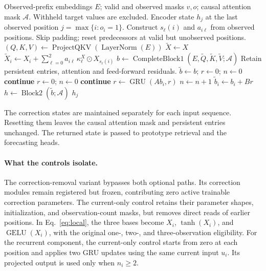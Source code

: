 \documentclass[runningheads]{llncs}
\newcommand{\GELU}{\operatorname{GELU}}
\begin{document}
\begin{algorithm}[H]
\caption{Causal local and recurrent history correction}
\label{alg:history-correction}
\small
\begin{algorithmic}[1]
\Require Observed-prefix embeddings $E$; valid and observed masks $v,o$;
\Statex \hspace{\algorithmicindent} causal attention mask $\mathcal A$. Withheld target values are excluded.
\Ensure Encoder state $h_j$ at the last observed position $j=\max\{i:o_i=1\}$.
\State Construct $s_\ell(i)$ and $a_{i\ell}$ from observed positions.
\Statex \hspace{\algorithmicindent} Skip padding; reset predecessors at valid but unobserved positions.
\State $(Q,K,V)\gets\operatorname{ProjectQKV}(\operatorname{LayerNorm}(E))$
    \State $\widetilde X\gets X$
        \State $\widetilde X_i\gets X_i+\sum_{\ell=0}^{2}a_{i\ell}\,\kappa^X_\ell\odot X_{s_\ell(i)}$
    \EndFor
\EndFor
\State $b\gets\operatorname{CompleteBlock1}(E,\widetilde Q,\widetilde K,\widetilde V;\mathcal A)$
\Statex \hspace{\algorithmicindent} Retain persistent entries, attention and feed-forward residuals.
\State $\widetilde b\gets b$; $r\gets0$; $n\gets0$
     \State \textbf{continue} \EndIf
        \State $r\gets0$; $n\gets0$
        \State \textbf{continue}
    \EndIf
    \State $r\gets\operatorname{GRU}(A b_i,r)$
    \State $n\gets n+1$
        \State $\widetilde b_i\gets b_i+B r$
    \EndIf
\EndFor
\State $h\gets\operatorname{Block2}(\widetilde b;\mathcal A)$
\State \Return $h_j$
\end{algorithmic}
\end{algorithm}

The correction states are maintained separately for each input sequence. Resetting them leaves the causal attention mask and persistent entries unchanged. The returned state is passed to prototype retrieval and the forecasting heads.

\paragraph{What the controls isolate.}
The correction-removal variant bypasses both optional paths. Its correction modules remain registered but frozen, contributing zero active trainable correction parameters. The current-only control retains their parameter shapes, initialization, and observation-count masks, but removes direct reads of earlier positions. In Eq.~\eqref{eq:local}, the three bases become $X_i$, $\tanh(X_i)$, and $\GELU(X_i)$, with the original one-, two-, and three-observation eligibility. For the recurrent component, the current-only control starts from zero at each position and applies two GRU updates using the same current input $u_i$. Its projected output is used only when $n_i\geq2$.
\end{document}
